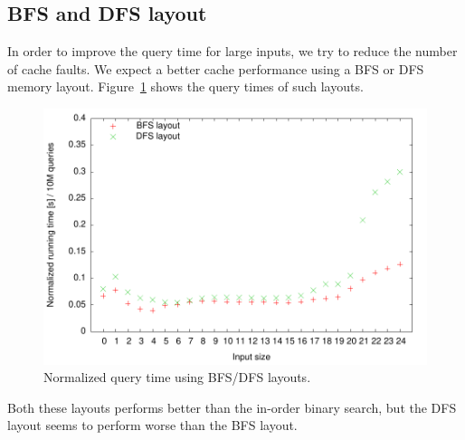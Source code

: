 \subsection{BFS and DFS layout}
In order to improve the query time for large inputs, we try to
reduce the number of cache faults. We expect a better cache
performance using a BFS or DFS memory
layout. Figure~\ref{fig:bfs_dfs_runningtime} shows the query times of
such layouts.
\begin{figure}[h!]
  \label{fig:bfs_dfs_runningtime}
  \centering
  \includegraphics{../week1/plots/outputs/bfs_dfs_runningtime}
  \caption{Normalized query time using BFS/DFS layouts.}
\end{figure}
Both these layouts performs better than the in-order binary search,
but the DFS layout seems to perform worse than the BFS layout.
